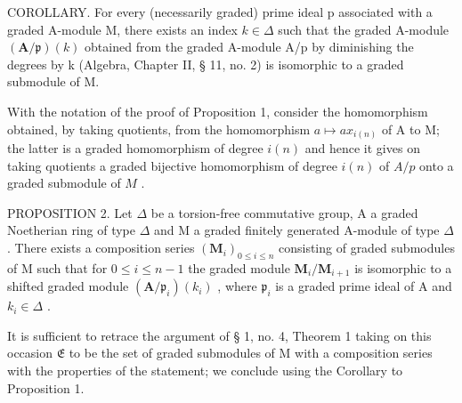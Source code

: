 COROLLARY. For every (necessarily graded) prime ideal p associated with a graded A-module M, there exists an index \(k \in \Delta\) such that the graded A-module \((\mathbf{A}/\mathfrak{p})(k)\) obtained from the graded A-module A/p by diminishing the degrees by k (Algebra, Chapter II, § 11, no. 2) is isomorphic to a graded submodule of M.

With the notation of the proof of Proposition 1, consider the homomorphism obtained, by taking quotients, from the homomorphism \(a \mapsto ax_{i(n)}\) of A to M; the latter is a graded homomorphism of degree \(i(n)\) and hence it gives on taking quotients a graded bijective homomorphism of degree \(i(n)\) of \(A / p\) onto a graded submodule of \(M\) .

PROPOSITION 2. Let \(\Delta\) be a torsion-free commutative group, A a graded Noetherian ring of type \(\Delta\) and M a graded finitely generated A-module of type \(\Delta\) . There exists a composition series \((\mathbf{M}_i)_{0 \leqslant i \leqslant n}\) consisting of graded submodules of M such that for \(0 \leqslant i \leqslant n - 1\) the graded module \(\mathbf{M}_i / \mathbf{M}_{i+1}\) is isomorphic to a shifted graded module \((\mathbf{A} / \mathfrak{p}_i)(k_i)\) , where \(\mathfrak{p}_i\) is a graded prime ideal of A and \(k_i \in \Delta\) .

It is sufficient to retrace the argument of § 1, no. 4, Theorem 1 taking on this occasion \(\mathfrak{E}\) to be the set of graded submodules of M with a composition series with the properties of the statement; we conclude using the Corollary to Proposition 1.

